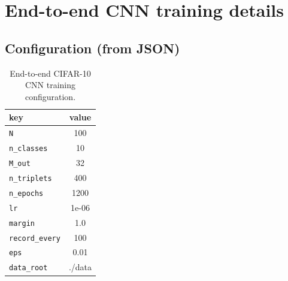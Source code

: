 \section{End-to-end CNN training details}
\label{app:e2e}

\subsection*{Configuration (from JSON)}
\begin{table}[H]
\centering
\caption{End-to-end CIFAR-10 CNN training configuration.}
\label{tab:e2e-config}
\begin{tabular}{l c}
\toprule
key & value \\
\midrule
\texttt{N} & 100 \\
\texttt{n\_classes} & 10 \\
\texttt{M\_out} & 32 \\
\texttt{n\_triplets} & 400 \\
\texttt{n\_epochs} & 1200 \\
\texttt{lr} & 1e-06 \\
\texttt{margin} & 1.0 \\
\texttt{record\_every} & 100 \\
\texttt{eps} & 0.01 \\
\texttt{data\_root} & ./data \\
\bottomrule
\end{tabular}
\end{table}

